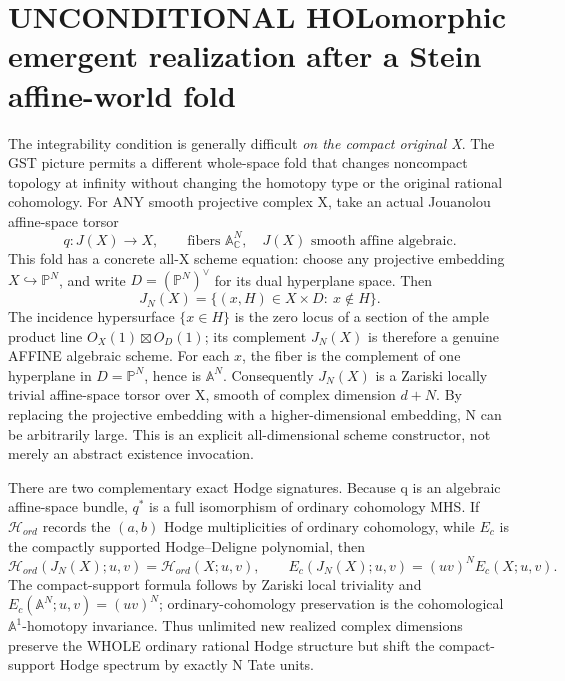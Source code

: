 \documentclass[11pt]{article}
\begin{document}
\section{UNCONDITIONAL HOLomorphic emergent realization after a Stein affine-world fold}

The integrability condition is generally difficult
\emph{on the compact original X}. The GST picture
permits a different whole-space fold that changes
noncompact topology at infinity without changing
the homotopy type or the original rational cohomology.
For ANY smooth projective complex X,
take an actual Jouanolou affine-space torsor
\[
  q:J(X)\longrightarrow X,\qquad
  \text{fibers } \mathbb A_{\mathbb C}^N,\quad
  J(X)\text{ smooth affine algebraic.}              \tag{13}
\]
This fold has a concrete all-X scheme equation:
choose any projective embedding $X\hookrightarrow\mathbb P^N$,
and write $D=(\mathbb P^N)^\vee$ for its dual hyperplane space.
Then
\[
 \boxed{
 J_N(X)=\{(x,H)\in X\times D:\ x\notin H\}.
 }                                                        \tag{13a}
\]
The incidence hypersurface $\{x\in H\}$ is the zero locus
of a section of the ample product line
$O_X(1)\boxtimes O_D(1)$; its complement $J_N(X)$ is
therefore a genuine AFFINE algebraic scheme.
For each $x$, the fiber is the complement of one hyperplane
in $D=\mathbb P^N$, hence is $\mathbb A^N$.
Consequently $J_N(X)$ is a Zariski locally trivial
affine-space torsor over X, smooth of complex
dimension $d+N$. By replacing the projective
embedding with a higher-dimensional embedding,
N can be arbitrarily large. This is an explicit
all-dimensional scheme constructor, not merely
an abstract existence invocation.

There are two complementary exact Hodge signatures.
Because q is an algebraic affine-space bundle,
$q^*$ is a full isomorphism of ordinary cohomology MHS.
If $\mathcal H_{ord}$ records the $(a,b)$ Hodge
multiplicities of ordinary cohomology,
while $E_c$ is the compactly supported
Hodge--Deligne polynomial, then
\[
 \boxed{
  \mathcal H_{ord}(J_N(X);u,v)=\mathcal H_{ord}(X;u,v),
  \qquad
  E_c(J_N(X);u,v)=(uv)^N E_c(X;u,v).
 }                                                        \tag{13b}
\]
The compact-support formula follows by Zariski local
triviality and $E_c(\mathbb A^N;u,v)=(uv)^N$;
ordinary-cohomology preservation is the
cohomological $\mathbb A^1$-homotopy invariance.
Thus unlimited new realized complex dimensions
preserve the WHOLE ordinary rational Hodge
structure but shift the compact-support
Hodge spectrum by exactly N Tate units.
\end{document}
